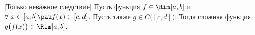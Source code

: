 [Только неважное следствие]
 	Пусть функция $f\in\Rim[a,b]$ и $\forall\  x\in[a,b]\pau f(x)\in[c,d]$. Пусть также $g\in C\big([c,d]\big)$. Тогда сложная функция $g\big(f(x)\big)\in\Rim[a,b]$.
 